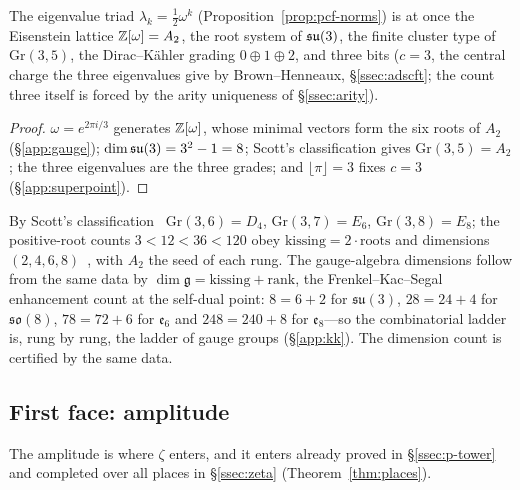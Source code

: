 \begin{proposition}\label{prop:a2}
The eigenvalue triad $\lambda_k=\tfrac12\omega^{k}$ (Proposition~\ref{prop:pcf-norms}) is at once
the Eisenstein lattice $\mathbb{Z}[\omega]=A_2$, the root system of $\mathfrak{su}(3)$, the finite cluster type of
$\mathrm{Gr}(3,5)$, the Dirac--K\"ahler grading $0\oplus1\oplus2$, and three bits ($c=3$, the central charge the
three eigenvalues give by Brown--Henneaux, \S\ref{ssec:adscft}; the count three itself is forced by
the arity uniqueness of \S\ref{ssec:arity}).

\end{proposition}
\begin{proof}
$\omega=e^{2\pi i/3}$ generates $\mathbb{Z}[\omega]$, whose minimal vectors form the six roots of $A_2$
(\S\ref*{app:gauge}); $\dim\mathfrak{su}(3)=3^2-1=8$; Scott's classification gives $\mathrm{Gr}(3,5)=A_2$;
the three eigenvalues are the three grades; and $\lfloor\pi\rfloor=3$ fixes $c=3$
(\S\ref*{app:superpoint}).
\end{proof}

\begin{proposition}\label{prop:ladder}
By Scott's classification~\cite{Scott,FZ} $\mathrm{Gr}(3,6)=D_4$, $\mathrm{Gr}(3,7)=E_6$, $\mathrm{Gr}(3,8)=E_8$;
the positive-root counts $3<12<36<120$ obey $\text{kissing}=2\cdot\text{roots}$ and dimensions $(2,4,6,8)$~\cite{ConwaySloane,Viazovska}, with $A_2$ the seed of each rung. The gauge-algebra dimensions
follow from the same data by $\dim\mathfrak g=\text{kissing}+\text{rank}$, the Frenkel--Kac--Segal
enhancement count at the self-dual point: $8=6+2$ for $\mathfrak{su}(3)$, $28=24+4$ for
$\mathfrak{so}(8)$, $78=72+6$ for $\mathfrak e_6$ and $248=240+8$ for $\mathfrak e_8$---so the
combinatorial ladder is, rung by rung, the ladder of gauge groups (\S\ref{app:kk}).
The dimension count is certified by the same data.


\end{proposition}

\subsection{First face: amplitude}\label{ssec:amp}
The amplitude is where $\zeta$ enters, and it enters already proved in \S\ref*{ssec:p-tower} and completed over all places in \S\ref*{ssec:zeta} (Theorem~\ref{thm:places}).

